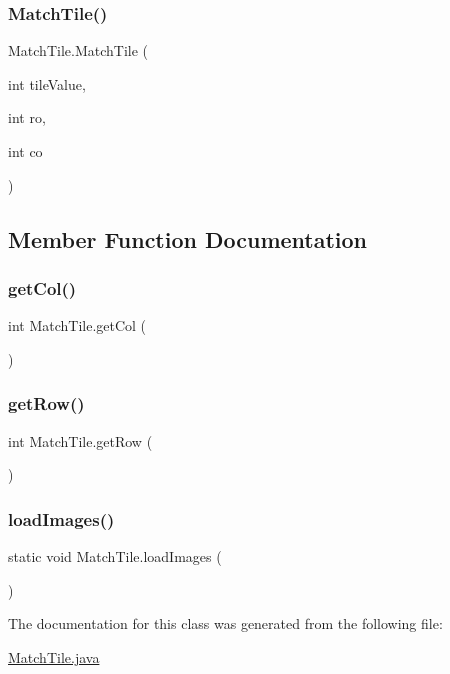 \subsubsection{\texorpdfstring{Match\+Tile()}{MatchTile()}}
{\footnotesize\ttfamily Match\+Tile.\+Match\+Tile (\begin{DoxyParamCaption}\item[{int}]{tile\+Value,  }\item[{int}]{ro,  }\item[{int}]{co }\end{DoxyParamCaption})}



\subsection{Member Function Documentation}
\mbox{\label{class_match_tile_a76b318319525d1945da6402652c347b7}} 
\subsubsection{\texorpdfstring{get\+Col()}{getCol()}}
{\footnotesize\ttfamily int Match\+Tile.\+get\+Col (\begin{DoxyParamCaption}{ }\end{DoxyParamCaption})}

\mbox{\label{class_match_tile_a1524b5b7c525f3af9533cf8f83cacc13}} 
\subsubsection{\texorpdfstring{get\+Row()}{getRow()}}
{\footnotesize\ttfamily int Match\+Tile.\+get\+Row (\begin{DoxyParamCaption}{ }\end{DoxyParamCaption})}

\mbox{\label{class_match_tile_a0637f46e6d19de24cfe69181fe480284}} 
\subsubsection{\texorpdfstring{load\+Images()}{loadImages()}}
{\footnotesize\ttfamily static void Match\+Tile.\+load\+Images (\begin{DoxyParamCaption}{ }\end{DoxyParamCaption})\hspace{0.3cm}{\ttfamily [static]}}



The documentation for this class was generated from the following file\+:\begin{DoxyCompactItemize}
\item 
\mbox{\hyperlink{_match_tile_8java}{Match\+Tile.\+java}}\end{DoxyCompactItemize}
